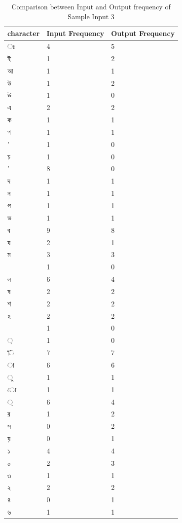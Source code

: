 \begin{table}[H]
\centering
\begin{tabular}{|p{2cm}|p{2cm}|p{2cm}|}
\hline
character & Input Frequency & Output Frequency \\
\hline
{\bengalifont ঃ} & 4 & 5\\
\hline
{\bengalifont ই} & 1 & 2\\
\hline
{\bengalifont আ} & 1 & 1\\
\hline
{\bengalifont উ} & 1 & 2\\
\hline
{\bengalifont ঊ} & 1 & 0\\
\hline
{\bengalifont এ} & 2 & 2\\
\hline
{\bengalifont ক} & 1 & 1\\
\hline
{\bengalifont গ} & 1 & 1\\
\hline
{\bengalifont ’} & 1 & 0\\
\hline
{\bengalifont চ} & 1 & 0\\
\hline
{\bengalifont '} & 8 & 0\\
\hline
{\bengalifont দ} & 1 & 1\\
\hline
{\bengalifont ন} & 1 & 1\\
\hline
{\bengalifont প} & 1 & 1\\
\hline
{\bengalifont ভ} & 1 & 1\\
\hline
{\bengalifont ব} & 9 & 8\\
\hline
{\bengalifont য} & 2 & 1\\
\hline
{\bengalifont ম} & 3 & 3\\
\hline
{\bengalifont 0} & 1 & 0\\
\hline
{\bengalifont ল} & 6 & 4\\
\hline
{\bengalifont ষ} & 2 & 2\\
\hline
{\bengalifont শ} & 2 & 2\\
\hline
{\bengalifont হ} & 2 & 2\\
\hline
{\bengalifont 8} & 1 & 0\\
\hline
{\bengalifont ়} & 1 & 0\\
\hline
{\bengalifont ি} & 7 & 7\\
\hline
{\bengalifont া} & 6 & 6\\
\hline
{\bengalifont ু} & 1 & 1\\
\hline
{\bengalifont ো} & 1 & 1\\
\hline
{\bengalifont ্} & 6 & 4\\
\hline
{\bengalifont র} & 1 & 2\\
\hline
{\bengalifont স} & 0 & 2\\
\hline
{\bengalifont য়} & 0 & 1\\
\hline
{\bengalifont ১} & 4 & 4\\
\hline
{\bengalifont ০} & 2 & 3\\
\hline
{\bengalifont ৩} & 1 & 1\\
\hline
{\bengalifont ২} & 2 & 2\\
\hline
{\bengalifont ৪} & 0 & 1\\
\hline
{\bengalifont ৬} & 1 & 1\\
\hline
\end{tabular}
\caption { Comparison between Input and Output frequency of Sample Input 3}
\label {tab:BTable3}
\end{table}

